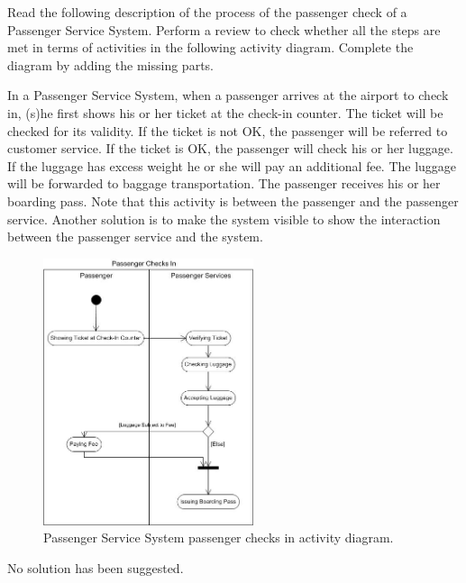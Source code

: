 \begin{exercise}
    Read the following description of the process of the passenger check of a Passenger Service System. Perform a review to check whether all the steps are met in terms of activities in the following activity diagram. Complete the diagram by adding the missing parts.
    
    \begin{displayquote}
        In a Passenger Service System, when a passenger arrives at the airport to check in, (s)he first shows his or her ticket at the check-in counter. The ticket will be checked for its validity. If the ticket is not OK, the passenger will be referred to customer service. If the ticket is OK, the passenger will check his or her luggage. If the luggage has excess weight he or she will pay an additional fee. The luggage will be forwarded to baggage transportation. The passenger receives his or her boarding pass. Note that this activity is between the passenger and the passenger service. Another solution is to make the system visible to show the interaction between the passenger service and the system.
    \end{displayquote}
    
    \begin{figure}[H]
        \centering
        \includegraphics[width=0.55\textwidth]{images/passenger-activity.jpg}
        \caption{Passenger Service System passenger checks in activity diagram.}
        \label{fig:pass-checks-in}
    \end{figure}
\end{exercise}

\begin{solution}
    No solution has been suggested.
\end{solution}
